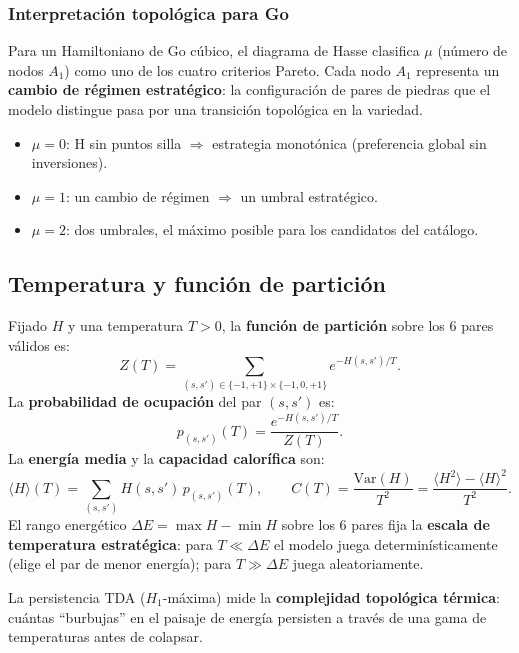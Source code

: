 \documentclass[11pt,a4paper]{article}
\newcommand{\dE}{\Delta E}
\begin{document}
\subsubsection{Interpretación topológica para Go}

Para un Hamiltoniano de Go cúbico, el diagrama de Hasse clasifica
$\mu$ (número de nodos $A_1$) como uno de los cuatro criterios Pareto.
Cada nodo $A_1$ representa un \textbf{cambio de régimen estratégico}:
la configuración de pares de piedras que el modelo distingue
pasa por una transición topológica en la variedad.

\begin{itemize}[noitemsep]
  \item $\mu = 0$: H sin puntos silla $\Rightarrow$ estrategia monotónica
        (preferencia global sin inversiones).
  \item $\mu = 1$: un cambio de régimen $\Rightarrow$ un umbral estratégico.
  \item $\mu = 2$: dos umbrales, el máximo posible para los candidatos
        del catálogo.
\end{itemize}

\subsection{Temperatura y función de partición}

\begin{tcolorbox}[defbox,title={Temperatura en el modelo de espín de Go}]
Fijado $H$ y una temperatura $T>0$, la \textbf{función de partición} sobre
los 6 pares válidos es:
\[
  Z(T) = \sum_{(s,s')\in\{-1,+1\}\times\{-1,0,+1\}}
         e^{-H(s,s')/T}.
\]
La \textbf{probabilidad de ocupación} del par $(s,s')$ es:
\[
  p_{(s,s')}(T) = \frac{e^{-H(s,s')/T}}{Z(T)}.
\]
La \textbf{energía media} y la \textbf{capacidad calorífica} son:
\[
  \langle H\rangle(T) = \sum_{(s,s')} H(s,s')\,p_{(s,s')}(T), \qquad
  C(T) = \frac{\text{Var}(H)}{T^2} = \frac{\langle H^2\rangle - \langle H\rangle^2}{T^2}.
\]
El rango energético $\dE = \max H - \min H$ sobre los 6 pares fija la
\textbf{escala de temperatura estratégica}: para $T\ll\dE$ el modelo juega
determinísticamente (elige el par de menor energía); para $T\gg\dE$ juega
aleatoriamente.
\end{tcolorbox}

La persistencia TDA ($H_1$-máxima) mide la \textbf{complejidad topológica
térmica}: cuántas ``burbujas'' en el paisaje de energía persisten a través
de una gama de temperaturas antes de colapsar.
\end{document}
